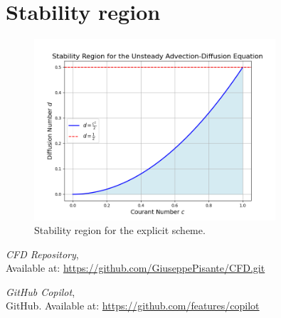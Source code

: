 \documentclass{article}
\begin{document}
\section{Stability region}
\begin{figure}[h]
  \centering
  \includegraphics[width=0.8\textwidth]{stability_region_plot.png}
  \caption{Stability region for the explicit scheme.}
  \label{fig:stability_region}
\end{figure}
\begin{thebibliography}{9}
  \textit{CFD Repository},\\
  Available at: \url{https://github.com/GiuseppePisante/CFD.git}
  
  \textit{GitHub Copilot},\\
  GitHub. Available at: \url{https://github.com/features/copilot}

\end{thebibliography}
\end{document}
